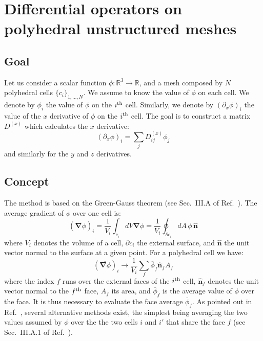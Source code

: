 \documentclass[]{article}
\newcommand{\bs}[1]{\boldsymbol{#1}}
\newcommand{\Eq}[1]{\begin{equation}#1\end{equation}}
\begin{document}
\section*{Differential operators on polyhedral unstructured meshes}
\subsection*{Goal}
Let us consider a scalar function $\phi:\mathbb{R}^3 \rightarrow \mathbb{R}$, and a mesh composed by $N$ polyhedral cells $\{c_i\}_{1,\dots,N}$. We assume to know the value of $\phi$ on each cell. We denote by $\phi_i$ the value of $\phi$ on the $i^{\text{\scriptsize th}}$ cell.  Similarly, we denote by $(\partial_x \phi)_i$ the value of the $x$ derivative of $\phi$  on the $i^{\text{\scriptsize th}}$ cell. The goal is to construct a matrix $D^{(x)}$ which calculates the $x$ derivative:
\Eq{(\partial_x \phi)_i = \sum_j D^{(x)}_{ij} \phi_j}
and similarly for the $y$ and $z$ derivatives.
\subsection*{Concept}
The method is based on the Green-Gauss theorem (see Sec.~III.A of Ref.~\cite{Sozer2014}). The average gradient of $\phi$ over one cell is:
\Eq{(\overline{ \bs{\nabla}\phi})_i  =\frac{1}{V_i} \int_{c_i} dV  \bs{\nabla}\phi = \frac{1}{V_i}  \oint_{\partial c_i} dA\, \phi \, \hat{\bs{n}}}
where $V_i$ denotes the volume of a cell, $\partial c_i$ the external surface, and $ \hat{\bs{n}}$ the unit vector normal to the surface at a given point. %
For a polyhedral cell we have:
 \Eq{(\overline{ \bs{\nabla}\phi})_i  \rightarrow  \frac{1}{V_i} \sum_f  \overline{\phi}_f  \hat{\bs{n}}_f A_f\label{eq:TheGradient1}}
where the index $f$ runs over the external faces of the $i^{\text{\scriptsize th}}$ cell, $ \hat{\bs{n}}_f$ denotes the  unit vector normal to the  $f^{\text{\scriptsize th}}$ face, $A_f$ its area, and $\overline{\phi}_f $ is the average value of $\phi$ over the face. It is thus necessary to evaluate the face average $\overline{\phi}_f $. As pointed out in  Ref.~\cite{Sozer2014}, several alternative methods exist, the simplest being averaging the two values assumed by $\phi$ over the the two cells $i$ and $i'$ that share the face $f$ (see Sec.~III.A.1 of Ref.~\cite{Sozer2014}).
\end{document}
